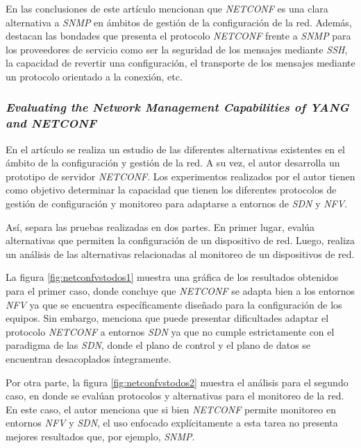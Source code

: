 En las conclusiones de este artículo mencionan que \textit{NETCONF} es una clara alternativa a \textit{SNMP} en ámbitos de gestión de la configuración de la red. Además, destacan las bondades que presenta el protocolo \textit{NETCONF} frente a \textit{SNMP} para los proveedores de servicio como ser la seguridad de los mensajes mediante \textit{SSH}, la capacidad de revertir una configuración, el transporte de los mensajes mediante un protocolo orientado a la conexión, etc.



\subsubsection*{\textit{Evaluating the Network Management Capabilities of YANG and NETCONF}}

En el artículo \parencite{netconfvstodos} se realiza un estudio de las diferentes alternativas existentes en el ámbito de la configuración y gestión de la red. A su vez, el autor desarrolla un prototipo de servidor \textit{NETCONF}. Los experimentos realizados por el autor tienen como objetivo determinar la capacidad que tienen los diferentes protocolos de gestión de configuración y monitoreo para adaptarse a entornos de \textit{SDN} y \textit{NFV}. 

Así, separa las pruebas realizadas en dos partes. En primer lugar, evalúa alternativas que permiten la configuración de un dispositivo de red. Luego, realiza un análisis de las alternativas relacionadas al monitoreo de un dispositivos de red.

La figura \ref{fig:netconfvstodos1} muestra una gráfica de los resultados obtenidos para el primer caso, donde concluye que \textit{NETCONF} se adapta bien a los entornos \textit{NFV} ya que se encuentra específicamente diseñado para la configuración de los equipos. Sin embargo, menciona que puede presentar dificultades adaptar el protocolo \textit{NETCONF} a entornos \textit{SDN} ya que no cumple estrictamente con el paradigma de las \textit{SDN}, donde el plano de control y el plano de datos se encuentran desacoplados íntegramente.

Por otra parte, la figura \ref{fig:netconfvstodos2} muestra el análisis para el segundo caso, en donde se evalúan protocolos y alternativas para el monitoreo de la red. En este caso, el autor menciona que si bien \textit{NETCONF} permite monitoreo en entornos \textit{NFV} y \textit{SDN}, el uso enfocado explícitamente a esta tarea no presenta mejores resultados que, por ejemplo, \textit{SNMP}.


